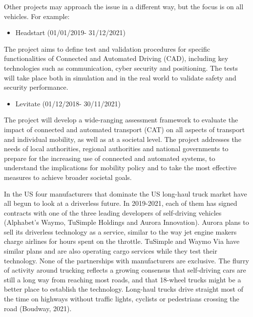 \documentclass[
]{book}
\providecommand{\tightlist}{%
  \setlength{\itemsep}{0pt}\setlength{\parskip}{0pt}}
\begin{document}
Other projects may approach the issue in a different way, but the focus is on all vehicles. For example:

\begin{itemize}
\tightlist
\item
  Headstart (01/01/2019- 31/12/2021)
\end{itemize}

The project aims to define test and validation procedures for specific functionalities of Connected and Automated Driving (CAD), including key technologies such as communication, cyber security and positioning. The tests will take place both in simulation and in the real world to validate safety and security performance.

\begin{itemize}
\tightlist
\item
  Levitate (01/12/2018- 30/11/2021)
\end{itemize}

The project will develop a wide-ranging assessment framework to evaluate the impact of connected and automated transport (CAT) on all aspects of transport and individual mobility, as well as at a societal level. The project addresses the needs of local authorities, regional authorities and national governments to prepare for the increasing use of connected and automated systems, to understand the implications for mobility policy and to take the most effective measures to achieve broader societal goals.

In the US four manufacturers that dominate the US long-haul truck market have all begun to look at a driverless future. In 2019-2021, each of them has signed contracts with one of the three leading developers of self-driving vehicles (Alphabet's Waymo, TuSimple Holdings and Aurora Innovation). Aurora plans to sell its driverless technology as a service, similar to the way jet engine makers charge airlines for hours spent on the throttle. TuSimple and Waymo Via have similar plans and are also operating cargo services while they test their technology. None of the partnerships with manufacturers are exclusive. The flurry of activity around trucking reflects a growing consensus that self-driving cars are still a long way from reaching most roads, and that 18-wheel trucks might be a better place to establish the technology. Long-haul trucks drive straight most of the time on highways without traffic lights, cyclists or pedestrians crossing the road (Boudway, 2021).
\end{document}
